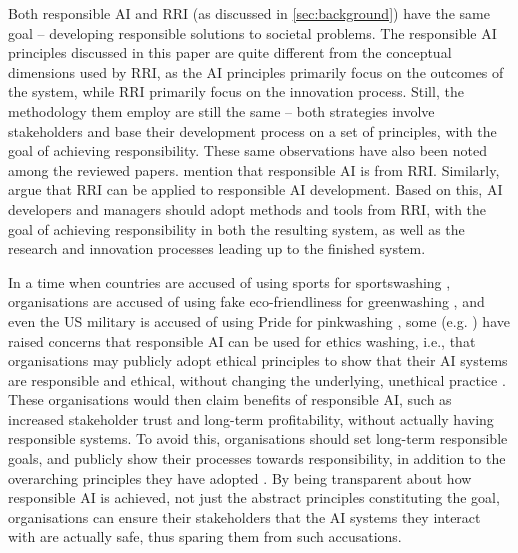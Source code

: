 Both responsible AI and RRI (as discussed in \autoref{sec:background}) have the same goal -- developing responsible solutions to societal problems. The responsible AI principles discussed in this paper are quite different from the conceptual dimensions used by RRI, as the AI principles primarily focus on the outcomes of the system, while RRI primarily focus on the innovation process. Still, the methodology them employ are still the same -- both strategies involve stakeholders and base their development process on a set of principles, with the goal of achieving responsibility. These same observations have also been noted among the reviewed papers. \textcite[p.~346]{Hacker_2022} mention that responsible AI is  from RRI. Similarly, \textcite{Dignum_2019} argue that RRI can be applied to responsible AI development. Based on this, AI developers and managers should adopt methods and tools from RRI, with the goal of achieving responsibility in both the resulting system, as well as the research and innovation processes leading up to the finished system.


In a time when countries are accused of using sports for sportswashing \parencite{Fruh_2022_sportswashing,Wearing_2022_sportswashing}, organisations are accused of using fake eco-friendliness for greenwashing \parencite{Gibbens_2022_greenwashing}, and even the US military is accused of using Pride for pinkwashing \parencite{Kane_2022_pinkwashing}, some (e.g. \cite{Gianni_2022,Havrda_2020,Morley_2021}) have raised concerns that responsible AI can be used for ethics washing, i.e., that organisations may publicly adopt ethical principles to show that their AI systems are responsible and ethical, without changing the underlying, unethical practice \parencite{Morley_2021}. These organisations would then claim benefits of responsible AI, such as increased stakeholder trust and long-term profitability, without actually having responsible systems. To avoid this, organisations should set long-term responsible goals, and publicly show their processes towards responsibility, in addition to the overarching principles they have adopted \parencite{Rakova_2021}. By being transparent about how responsible AI is achieved, not just the abstract principles constituting the goal, organisations can ensure their stakeholders that the AI systems they interact with are actually safe, thus sparing them from such accusations.


